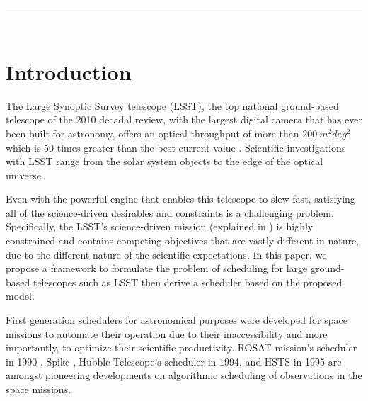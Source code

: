\documentclass[12pt,aas_macros]{article}
\theoremstyle{definition}
\begin{document}
\noindent\rule{\textwidth}{0.4pt}\\
\newpage



\section{Introduction}

The Large Synoptic Survey telescope (LSST), the top national ground-based telescope of the 2010 decadal review, with the largest digital camera that has ever been built for astronomy, offers an optical throughput of more than $200~m^2 deg^2$ which is 50 times greater than the best current value \cite{tyson2002large}. Scientific investigations with LSST range from the solar system objects to the edge of the optical universe. 

Even with the powerful engine that enables this telescope to slew fast, satisfying all of the science-driven desirables and constraints is a challenging problem. Specifically, the LSST's science-driven mission (explained in \cite{ivezic2008large}) is highly constrained and contains competing objectives that are vastly different in nature, due to the different nature of the scientific expectations. In this paper, we propose a framework to formulate the problem of scheduling for large ground-based telescopes such as LSST then derive a scheduler based on the proposed model.

First generation schedulers for astronomical purposes were developed for space missions to automate their operation due to their inaccessibility and more importantly, to optimize their scientific productivity. ROSAT mission's scheduler in 1990 \cite{nowakovski1999using},  Spike \cite{johnston1994spike}, Hubble Telescope's scheduler in 1994, and HSTS \cite{muscettola1995automating} in 1995 are amongst pioneering developments on algorithmic scheduling of observations in the space missions. 
\end{document}

